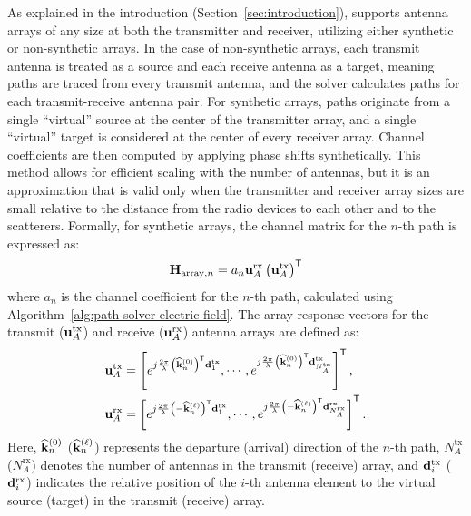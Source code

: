 As explained in the introduction (Section~\ref{sec:introduction}), \SRT{} supports antenna arrays of any size at both the transmitter and receiver, utilizing either synthetic or non-synthetic arrays. In the case of non-synthetic arrays, each transmit antenna is treated as a source and each receive antenna as a target, meaning paths are traced from every transmit antenna, and the solver calculates paths for each transmit-receive antenna pair. For synthetic arrays, paths originate from a single ``virtual'' source at the center of the transmitter array, and a single ``virtual'' target is considered at the center of every receiver array. Channel coefficients are then computed by applying phase shifts synthetically. This method allows for efficient scaling with the number of antennas, but it is an approximation that is valid only when the transmitter and receiver array sizes are small relative to the distance from the radio devices to each other and to the scatterers. Formally, for synthetic arrays, the channel matrix for the $n$-th path is expressed as:
\begin{equation}
    \mathbf{H}_{\text{array}, n} = a_n \mathbf{u}_A^{\text{rx}} \left( \mathbf{u}_A^{\text{tx}} \right)^{\mathsf{T}}
\end{equation}
where $a_n$ is the channel coefficient for the $n$-th path, calculated using Algorithm~\ref{alg:path-solver-electric-field}. The array response vectors for the transmit ($\mathbf{u}_A^{\text{tx}}$) and receive ($\mathbf{u}_A^{\text{rx}}$) antenna arrays are defined as:
\begin{equation}
    \label{eq:path-solver-array-response-vector}
    \begin{aligned}
        \mathbf{u}_A^{\text{tx}} &= \left[ e^{j \frac{2\pi}{\lambda}\left( \widehat{\mathbf{k}}_n^{(0)} \right) ^{\mathsf{T}}\mathbf{d}_1^{\text{tx}}}, \cdots, e^{j \frac{2\pi}{\lambda}\left( \widehat{\mathbf{k}}_n^{(0)} \right) ^{\mathsf{T}}\mathbf{d}_{N_A^{\text{tx}}}^\text{tx}} \right]^{\mathsf{T}},\\
        \mathbf{u}_A^{\text{rx}} &= \left[ e^{j \frac{2\pi}{\lambda}\left( -\widehat{\mathbf{k}}_n^{(\ell)} \right) ^{\mathsf{T}}\mathbf{d}_1^{\text{rx}}}, \cdots, e^{j \frac{2\pi}{\lambda}\left( -\widehat{\mathbf{k}}_n^{(\ell)} \right) ^{\mathsf{T}}\mathbf{d}_{N_A^{\text{rx}}}^\text{rx}} \right]^{\mathsf{T}}.
    \end{aligned}
\end{equation}
Here, $\widehat{\mathbf{k}}_n^{(0)}$ ($\widehat{\mathbf{k}}_n^{(\ell)}$) represents the departure (arrival) direction of the $n$-th path, $N_A^{\text{tx}}$ ($N_A^{\text{rx}}$) denotes the number of antennas in the transmit (receive) array, and $\mathbf{d}_i^{\text{tx}}$ ($\mathbf{d}_i^{\text{rx}}$) indicates the relative position of the $i$-th antenna element to the virtual source (target) in the transmit (receive) array.


